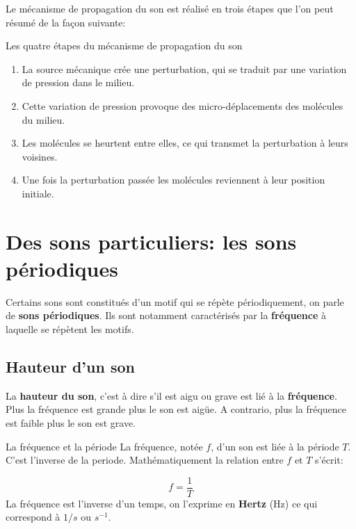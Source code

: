 \documentclass[french]{article}
\begin{document}
Le mécanisme de propagation du son est réalisé en trois étapes que l'on peut résumé de la façon suivante: 

\begin{definition}{Les quatre étapes du mécanisme de propagation du son}

\begin{enumerate}
	\item La source mécanique crée une perturbation, qui se traduit par une variation de pression dans le milieu.
	\item Cette variation de pression provoque des micro-déplacements des molécules du milieu.
	\item Les molécules se heurtent entre elles, ce qui transmet la perturbation à leurs voisines.
\item Une fois la perturbation passée les molécules reviennent à leur position initiale.
\end{enumerate}
\end{definition}


\section{Des sons particuliers: les sons périodiques}

Certains sons sont constitués d'un motif qui se répète périodiquement, on parle de \textbf{sons périodiques}. Ils sont notamment caractérisés par la \textbf{fréquence} à laquelle se répètent les motifs.

 
\subsection{Hauteur d'un son}
La \textbf{hauteur du son}, c'est à dire s'il est aigu ou grave est lié à la \textbf{fréquence}. Plus la fréquence est grande plus le son est aigüe. A contrario, plus la fréquence est faible plus le son est grave. 

\begin{definition}{La fréquence et la période}
La fréquence, notée $f$, d'un son est liée à la période $T$. C'est l'inverse de la periode. Mathématiquement la relation entre $f$ et $T$ s'écrit: 

\begin{equation}
	f = \dfrac{1}{T}
\end{equation}
La fréquence est l'inverse d'un temps, on l'exprime en \textbf{Hertz} (Hz) ce qui correspond à $1/s$ ou $s^{-1}$.
\end{definition}
\end{document}
